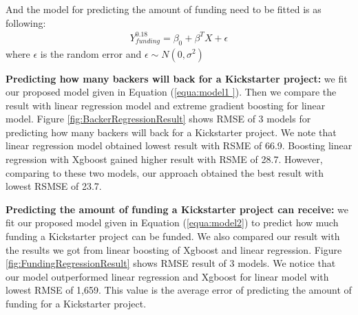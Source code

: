 And the model for predicting the amount of funding need to be fitted is as following:
\begin{equation}
\label{equa:model2}
\begin{aligned}
	Y_{funding}^{0.18} = \beta_0 + \beta^TX + \epsilon
\end{aligned}
\end{equation}
where $\epsilon$ is the random error and $\epsilon\sim N(0, \sigma^2)$ 

\textbf{Predicting how many backers will back for a Kickstarter project:} we fit our proposed model given in Equation (\ref{equa:model1 }). Then we compare the result with linear regression model and extreme gradient boosting for linear model. Figure \ref{fig:BackerRegressionResult} shows RMSE of 3 models for predicting how many backers will back for a Kickstarter project. We note that linear regression model obtained lowest result with RSME of 66.9. Boosting linear regression with Xgboost gained higher result with RSME of 28.7. However, comparing to these two models, our approach obtained the best result with lowest RSMSE of 23.7.


\textbf{Predicting the amount of funding a Kickstarter project can receive:} we fit our proposed model given in Equation (\ref{equa:model2}) to predict how much funding a Kickstarter project can be funded. We also compared our result with the results we got from linear boosting of Xgboost and linear regression. Figure \ref{fig:FundingRegressionResult} shows RMSE result of 3 models. We notice that our model outperformed linear regression and Xgboost for linear model with lowest RMSE of 1,659. This value is the average error of predicting the amount of funding for a Kickstarter project. 


